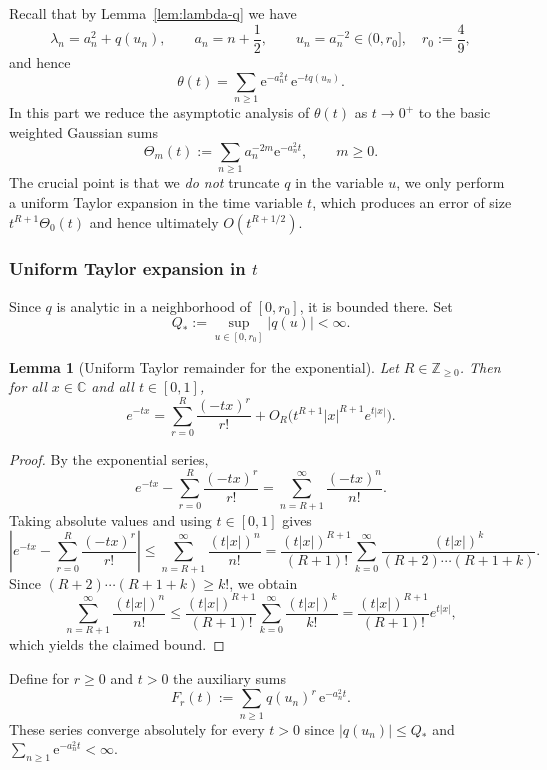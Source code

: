 \documentclass[11pt,letterpaper]{amsart}
\numberwithin{equation}{section}
\newtheorem{lemma}[theorem]{Lemma}
\theoremstyle{definition}
\newcommand{\C}{\mathbb{C}}
\newcommand{\Z}{\mathbb{Z}}
\newcommand{\e}{\mathrm{e}}
\begin{document}
Recall that by Lemma~\ref{lem:lambda-q} we have
\[
\lambda_n=a_n^2+q(u_n),\qquad a_n=n+\frac12,\qquad u_n=a_n^{-2}\in(0,r_0],
\quad r_0:=\frac49,
\]
and hence
\begin{equation}\label{eq:theta-split-correct}
\theta(t)=\sum_{n\ge 1}\e^{-a_n^2 t}\,\e^{-tq(u_n)}.
\end{equation}
In this part we reduce the asymptotic analysis of $\theta(t)$ as $t\to 0^+$ to the
basic weighted Gaussian sums
\[
\Theta_m(t):=\sum_{n\ge 1}a_n^{-2m}\e^{-a_n^2 t},\qquad m\ge 0.
\]
The crucial point is that we \emph{do not} truncate $q$ in the variable $u$, we only
perform a uniform Taylor expansion in the time variable $t$, which produces an
error of size $t^{R+1}\Theta_0(t)$ and hence ultimately $O(t^{R+1/2})$.

\subsubsection{Uniform Taylor expansion in $t$}\label{subsec:t-taylor}

Since $q$ is analytic in a neighborhood of $[0,r_0]$, it is bounded there. Set
\[
Q_*:=\sup_{u\in[0,r_0]}|q(u)|<\infty.
\]

\begin{lemma}[Uniform Taylor remainder for the exponential]\label{lem:exp-taylor}
Let $R\in\Z_{\ge0}$. Then for all $x\in\C$ and all $t\in[0,1]$,
\begin{equation}\label{eq:exp-taylor}
    e^{-tx}=\sum_{r=0}^{R}\frac{(-tx)^r}{r!}+O_R\!\bigl(t^{R+1}|x|^{R+1}e^{t|x|}\bigr).
\end{equation}
\end{lemma}

\begin{proof}
By the exponential series,
\[
e^{-tx}-\sum_{r=0}^{R}\frac{(-tx)^r}{r!}
=\sum_{n=R+1}^{\infty}\frac{(-tx)^n}{n!}.
\]
Taking absolute values and using $t\in[0,1]$ gives
\[
\left|e^{-tx}-\sum_{r=0}^{R}\frac{(-tx)^r}{r!}\right|
\le \sum_{n=R+1}^{\infty}\frac{(t|x|)^n}{n!}
=\frac{(t|x|)^{R+1}}{(R+1)!}\sum_{k=0}^{\infty}\frac{(t|x|)^k}{(R+2)\cdots(R+1+k)}.
\]
Since $(R+2)\cdots(R+1+k)\ge k!$, we obtain
\[
\sum_{n=R+1}^{\infty}\frac{(t|x|)^n}{n!}
\le \frac{(t|x|)^{R+1}}{(R+1)!}\sum_{k=0}^{\infty}\frac{(t|x|)^k}{k!}
=\frac{(t|x|)^{R+1}}{(R+1)!}e^{t|x|},
\]
which yields the claimed bound.
\end{proof}


Define for $r\ge 0$ and $t>0$ the auxiliary sums
\begin{equation}\label{eq:def-Fr}
F_r(t):=\sum_{n\ge 1}q(u_n)^r\,\e^{-a_n^2 t}.
\end{equation}
These series converge absolutely for every $t>0$ since $|q(u_n)|\le Q_*$ and
$\sum_{n\ge 1}\e^{-a_n^2 t}<\infty$.
\end{document}
